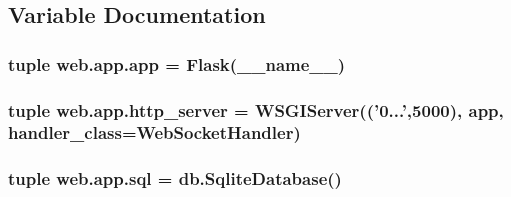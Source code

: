 \subsection{Variable Documentation}
\hypertarget{namespaceweb_1_1app_af49b9ed96516aeb4dd570f3ed9f98826}{
\subsubsection[{app}]{\setlength{\rightskip}{0pt plus 5cm}tuple web.\-app.\-app = Flask(\-\_\-\-\_\-name\-\_\-\-\_\-)}}\label{namespaceweb_1_1app_af49b9ed96516aeb4dd570f3ed9f98826}
\hypertarget{namespaceweb_1_1app_ac8a4afaed9ae7354427e4f68517e1bb6}{
\subsubsection[{http\-\_\-server}]{\setlength{\rightskip}{0pt plus 5cm}tuple web.\-app.\-http\-\_\-server = W\-S\-G\-I\-Server(('0...',5000), {\bf app}, handler\-\_\-class=Web\-Socket\-Handler)}}\label{namespaceweb_1_1app_ac8a4afaed9ae7354427e4f68517e1bb6}
\hypertarget{namespaceweb_1_1app_a53f0a841bb2a563afe0e1b27884ce7e2}{
\subsubsection[{sql}]{\setlength{\rightskip}{0pt plus 5cm}tuple web.\-app.\-sql = db.\-Sqlite\-Database()}}\label{namespaceweb_1_1app_a53f0a841bb2a563afe0e1b27884ce7e2}
